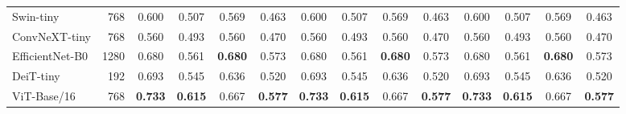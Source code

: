 \documentclass[conference]{IEEEtran}
\begin{document}
\begin{table}[t]
\begin{tabular}{lrcccccccccccc}
Swin-tiny & 768 & 0.600 & 0.507 & 0.569 & 0.463 & 0.600 & 0.507 & 0.569 & 0.463 & 0.600 & 0.507 & 0.569 & 0.463\\
ConvNeXT-tiny & 768 & 0.560 & 0.493 & 0.560 & 0.470 & 0.560 & 0.493 & 0.560 & 0.470 & 0.560 & 0.493 & 0.560 & 0.470\\
EfficientNet-B0 & 1280 & 0.680 & 0.561 & \textbf{0.680} & 0.573 & 0.680 & 0.561 & \textbf{0.680} & 0.573 & 0.680 & 0.561 & \textbf{0.680} & 0.573\\
DeiT-tiny & 192 & 0.693 & 0.545 & 0.636 & 0.520 & 0.693 & 0.545 & 0.636 & 0.520 & 0.693 & 0.545 & 0.636 & 0.520\\
ViT-Base/16 & 768 & \textbf{0.733} & \textbf{0.615} & 0.667 & \textbf{0.577} & \textbf{0.733} & \textbf{0.615} & 0.667 & \textbf{0.577} & \textbf{0.733} & \textbf{0.615} & 0.667 & \textbf{0.577}\\
\bottomrule
\end{tabular}
\end{table}
\end{document}
